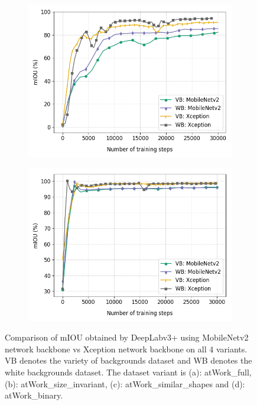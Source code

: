 \begin{figure}
\begin{subfigure}{.5\textwidth}
			\includegraphics[width=1\linewidth]{images/mobxcep_shape}
			\label{backbonesc}
			\caption{}
		\end{subfigure}
		\begin{subfigure}{.5\textwidth}
			\centering
			\includegraphics[width=1\linewidth]{images/mobxcep_binary}
			\label{backbonesd}
			\caption{}
		\end{subfigure}
		\caption{Comparison of mIOU obtained by DeepLabv3+ using MobileNetv2 network backbone vs Xception network backbone on all 4 variants. VB denotes the variety of backgrounds dataset and WB denotes the white backgrounds dataset. The dataset variant is (a): atWork\_full, (b): atWork\_size\_invariant, (c): atWork\_similar\_shapes and (d): atWork\_binary.}
		\label{Fig:backbones}
	\end{figure}

